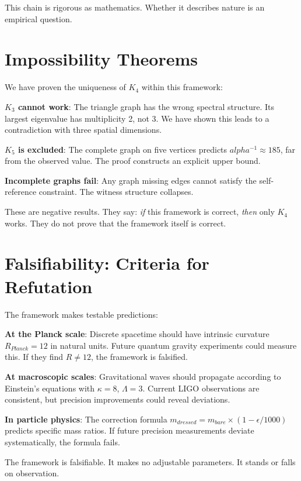 \documentclass[11pt,a4paper]{book}
\def\alpha{alpha}%
\def\text#1{#1}%
\begin{document}
This chain is rigorous as mathematics. Whether it describes nature is an empirical question.

\section{Impossibility Theorems}

We have proven the uniqueness of $K_4$ within this framework:

\textbf{$K_3$ cannot work}: The triangle graph has the wrong spectral structure. Its largest eigenvalue has multiplicity 2, not 3. We have shown this leads to a contradiction with three spatial dimensions.

\textbf{$K_5$ is excluded}: The complete graph on five vertices predicts $\alpha^{-1} \approx 185$, far from the observed value. The proof constructs an explicit upper bound.

\textbf{Incomplete graphs fail}: Any graph missing edges cannot satisfy the self-reference constraint. The witness structure collapses.

These are negative results. They say: \emph{if} this framework is correct, \emph{then} only $K_4$ works. They do not prove that the framework itself is correct.

\section{Falsifiability: Criteria for Refutation}

The framework makes testable predictions:

\textbf{At the Planck scale}: Discrete spacetime should have intrinsic curvature $R_{\text{Planck}} = 12$ in natural units. Future quantum gravity experiments could measure this. If they find $R \neq 12$, the framework is falsified.

\textbf{At macroscopic scales}: Gravitational waves should propagate according to Einstein's equations with $\kappa = 8$, $\Lambda = 3$. Current LIGO observations are consistent, but precision improvements could reveal deviations.

\textbf{In particle physics}: The correction formula $m_{\text{dressed}} = m_{\text{bare}} \times (1 - \epsilon/1000)$ predicts specific mass ratios. If future precision measurements deviate systematically, the formula fails.

The framework is falsifiable. It makes no adjustable parameters. It stands or falls on observation.
\end{document}
